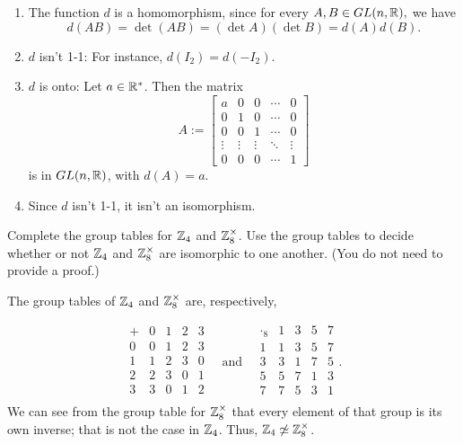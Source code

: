 \begin{solution}[print=false]

\begin{enumerate}

\item The function $d$ is a homomorphism, since for every $A,B \in
    GL(n,\mathbb{R}),$ we have
$$d(AB)=\det(AB)=(\det A)(\det B)=d(A)d(B).$$

\item $d$ isn't 1-1: For instance, $d(I_2)=d(-I_2)$.

\item $d$ is onto: Let $a\in \mathbb{R}^*$. Then the matrix
$$A:=\begin{bmatrix}
a & 0 & 0 & \cdots & 0 \\
0 & 1 & 0 & \cdots & 0 \\
0 & 0 & 1 & \cdots & 0 \\
\vdots & \vdots & \vdots & \ddots & \vdots \\
0 & 0 & 0 & \cdots & 1 \end{bmatrix}$$ is in $GL(n,\mathbb{R})$, with $d(A)=a$.

\item Since $d$ isn't 1-1, it isn't  an
isomorphism.
\end{enumerate}
\end{solution}

\begin{exercise}[ID=3B]
Complete the group tables for $\mathbb{Z}_4$ and $\mathbb{Z}_8^{\times}$. Use the group tables to decide whether or not $\mathbb{Z}_4$ and $\mathbb{Z}_8^{\times}$ are isomorphic to one another. (You do not need to provide a proof.)
\end{exercise}

\begin{solution}[print=false]
The group tables of $\mathbb{Z}_4$ and $\mathbb{Z}_8^{\times}$ are, respectively,

\renewcommand{\arraystretch}{1.3}
$$\begin{array}{c||c|c|c|c}
+&0&1&2&3\\ \hline\hline 0&0&1&2&3\\ \hline
1&1&2&3&0\\ \hline 2&2&3&0&1\\ \hline 3&3&0&1&2\\
\end{array} \quad \mbox{and} \quad
\begin{array}{c||c|c|c|c}
\cdot_8&1&3&5&7\\ \hline\hline 1&1&3&5&7\\ \hline 3&3&1&7&5\\
\hline 5&5&7&1&3 \\ \hline 7&7&5&3&1\\
\end{array}.$$
\medskip
We can see from the group table for $\mathbb{Z}_8^{\times}$ that every element of that group is its own inverse; that is not the case in $\mathbb{Z}_4$.  Thus, $\mathbb{Z}_4\not\simeq\mathbb{Z}_8^{\times}$.

\end{solution}

